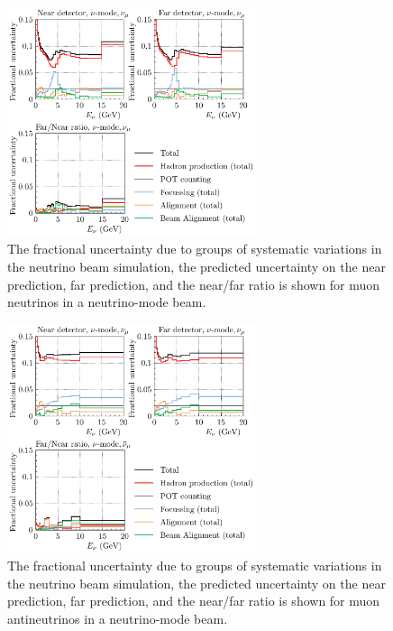 \documentclass{article}
\begin{document}
\begin{figure}
  \centering
  \includegraphics[width=0.65\textwidth]{plots/fracerrs/numode_numu_ErrType}
  \caption{The fractional uncertainty due to groups of systematic variations in the neutrino beam simulation, the predicted uncertainty on the near prediction, far prediction, and the near/far ratio is shown for muon neutrinos in a neutrino-mode beam. }
  \label{fig:grp_nu_numu}
\end{figure}

\begin{figure}
  \centering
  \includegraphics[width=0.65\textwidth]{plots/fracerrs/numode_numubar_ErrType}
  \caption{The fractional uncertainty due to groups of systematic variations in the neutrino beam simulation, the predicted uncertainty on the near prediction, far prediction, and the near/far ratio is shown for muon antineutrinos in a neutrino-mode beam.}
  \label{fig:grp_nu_numubar}
\end{figure}
\end{document}
